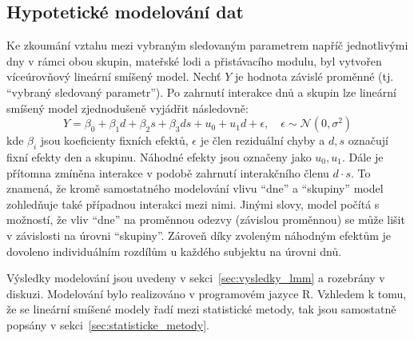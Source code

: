 \subsection{Hypotetické modelování dat}
\label{subsec:tvorba_modelů}
Ke zkoumání vztahu mezi vybraným sledovaným parametrem napříč jednotlivými dny v
rámci obou skupin, mateřské lodi a přistávacího modulu, byl vytvořen
víceúrovňový lineární smíšený model. Nechť $Y$ je hodnota závislé proměnné (tj.
\enquote{vybraný sledovaný parametr}). Po zahrnutí interakce dnů a skupin lze
lineární smíšený model zjednodušeně vyjádřit následovně:
\begin{equation}
      Y = \beta_{0}+\beta_{1} {d}+\beta_{2} {s}+\beta_{3} {d} {s} + u_{0} + u_{1}d + \epsilon, \quad \epsilon \sim \mathcal{N}\left(0, \sigma^2\right)
\end{equation}
kde $\beta_i$ jsou koeficienty fixních efektů, $\epsilon$ je člen reziduální
chyby a $d, s$ označují fixní efekty den a skupinu. Náhodné efekty jsou označeny
jako $u_0, u_1$. Dále je přítomna zmíněna interakce v podobě zahrnutí
interakčního členu $d \cdot s$. To znamená, že kromě samostatného modelování
vlivu \enquote{dne} a \enquote{skupiny} model zohledňuje také případnou
interakci mezi nimi. Jinými slovy, model počítá s možností, že vliv
\enquote{dne} na proměnnou odezvy (závislou proměnnou) se může lišit v
závislosti na úrovni \enquote{skupiny}. Zároveň díky zvoleným náhodným efektům
je dovoleno individuálním rozdílům u každého subjektu na úrovni dnů.

Výsledky modelování jsou uvedeny v sekci~\ref{sec:vysledky_lmm} a rozebrány v
diskuzi. Modelování bylo realizováno v programovém jazyce R. Vzhledem k tomu, že
se lineární smíšené modely řadí mezi statistické metody, tak jsou samostatně
popsány v sekci~\ref{sec:statisticke_metody}.